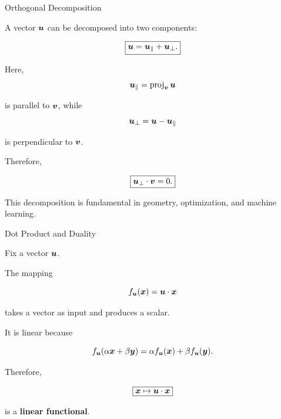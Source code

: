\begin{frame}{Orthogonal Decomposition}

A vector $\bm{u}$ can be decomposed into two components:

\[
\boxed{
\bm{u}
=
\bm{u}_{\parallel}
+
\bm{u}_{\perp}.
}
\]

Here,
\vspace{-0.1cm}
\[
\bm{u}_{\parallel}
=
\operatorname{proj}_{\bm{v}}\bm{u}
\]

is parallel to $\bm{v}$, while
\vspace{-0.1cm}
\[
\bm{u}_{\perp}
=
\bm{u}-\bm{u}_{\parallel}
\]

is perpendicular to $\bm{v}$.

Therefore,

\[
\boxed{
\bm{u}_{\perp}\cdot\bm{v}=0.
}
\]

This decomposition is fundamental in geometry,
optimization, and machine learning.

\end{frame}



\begin{frame}{Dot Product and Duality}

Fix a vector $\bm{u}$.

The mapping

\[
f_{\bm{u}}(\bm{x})
=
\bm{u}\cdot\bm{x}
\]

takes a vector as input and produces a scalar.

It is linear because

\[
f_{\bm{u}}(\alpha\bm{x}+\beta\bm{y})
=
\alpha f_{\bm{u}}(\bm{x})
+
\beta f_{\bm{u}}(\bm{y}).
\]

Therefore,

\[
\boxed{
\bm{x}\mapsto\bm{u}\cdot\bm{x}
}
\]

is a \textbf{linear functional}.

\end{frame}



